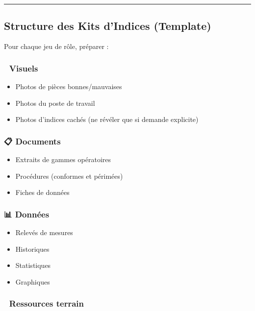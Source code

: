 \documentclass[
]{article}
\providecommand{\tightlist}{%
  \setlength{\itemsep}{0pt}\setlength{\parskip}{0pt}}
\begin{document}
\begin{center}\rule{0.5\linewidth}{0.5pt}\end{center}

\subsection{Structure des Kits d'Indices
(Template)}\label{structure-des-kits-dindices-template}

Pour chaque jeu de rôle, préparer :

\subsubsection{📸 Visuels}\label{visuels}

\begin{itemize}
\tightlist
\item
  Photos de pièces bonnes/mauvaises
\item
  Photos du poste de travail
\item
  Photos d'indices cachés (ne révéler que si demande explicite)
\end{itemize}

\subsubsection{📋 Documents}\label{documents}

\begin{itemize}
\tightlist
\item
  Extraits de gammes opératoires
\item
  Procédures (conformes et périmées)
\item
  Fiches de données
\end{itemize}

\subsubsection{📊 Données}\label{donnuxe9es}

\begin{itemize}
\tightlist
\item
  Relevés de mesures
\item
  Historiques
\item
  Statistiques
\item
  Graphiques
\end{itemize}

\subsubsection{🔧 Ressources terrain}\label{ressources-terrain}
\end{document}

